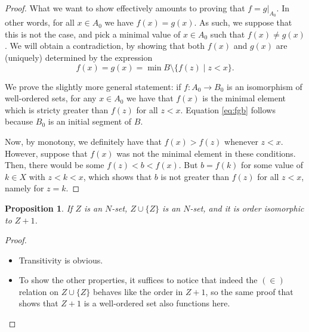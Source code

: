 \documentclass{article}
\newtheorem{prop}{Proposition}
\theoremstyle{nonumberplain}
\newtheorem{proof}{Proof}
\begin{document}
\begin{proof}
What we want to show effectively amounts to proving that $f = g|_{A_0}$. In other words, for all $x \in A_0$ we have $f(x) = g(x)$. As such, we suppose that this is not the case, and pick a minimal value of $x \in A_0$ such that $f(x) \neq g(x)$. We will obtain a contradiction, by showing that both $f(x)$ and $g(x)$ are (uniquely) determined by the expression
\begin{equation}\label{eq:fgb}
f(x) = g(x) = \min B \setminus \{f(z) \mid z < x\}.
\end{equation}

We prove the slightly more general statement: if $f \colon A_0 \to B_0$ is an isomorphism of well-ordered sets, for any $x \in A_0$ we have that $f(x)$ is the minimal element which is stricty greater than $f(z)$ for all $z < x$. Equation \eqref{eq:fgb} follows because $B_0$ is an initial segment of $B$.

Now, by monotony, we definitely have that $f(x) > f(z)$ whenever $z < x$. However, suppose that $f(x)$ was not the minimal element in these conditions. Then, there would be some $f(z) < b < f(x)$. But $b = f(k)$ for some value of $k \in X$ with $z < k < x$, which shows that $b$ is not greater than $f(z)$ for all $z < x$, namely for $z = k$.
\end{proof}

\begin{prop}\label{prop:suc}
If $Z$ is an $N$-set, $Z \cup \{Z\}$ is an $N$-set, and it is order isomorphic to $Z+1$.
\end{prop}

\begin{proof}
\leavevmode
\begin{itemize}
\item Transitivity is obvious.
\item To show the other properties, it suffices to notice that indeed the $(\in)$ relation on $Z \cup \{Z\}$ behaves like the order in $Z+1$, so the same proof that shows that $Z+1$ is a well-ordered set also functions here.
\end{itemize}
\end{proof}
\end{document}
